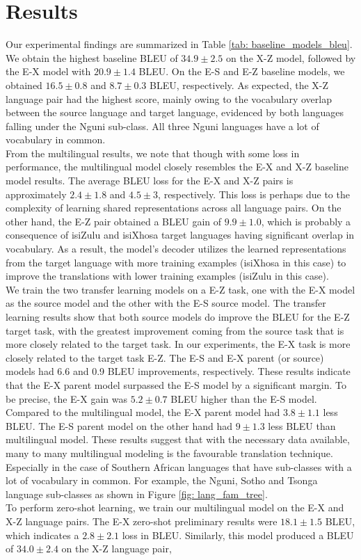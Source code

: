 \documentclass[11pt,a4paper]{article}
\begin{document}
\section{Results}\label{sec: results}
Our experimental findings are summarized in Table \ref{tab: baseline_models_bleu}. We obtain the highest baseline BLEU of $34.9 \pm2.5$ on the X-Z model, followed by the E-X model with $20.9 \pm1.4$ BLEU. On the E-S and E-Z baseline models, we obtained $16.5 \pm0.8$ and $8.7 \pm0.3$ BLEU, respectively. As expected, the X-Z language pair had the highest score, mainly owing to the vocabulary overlap between the source language and target language, evidenced by both languages falling under the Nguni sub-class. All three Nguni languages have a lot of vocabulary in common.\\ \indent From the multilingual results, we note that though with some loss in performance, the multilingual model closely resembles the E-X and X-Z baseline model results. The average BLEU loss for the  E-X and X-Z pairs is approximately $2.4 \pm 1.8$ and $4.5 \pm 3$, respectively. This loss is perhaps due to the complexity of learning shared representations across all language pairs. On the other hand, the E-Z pair obtained a BLEU gain of $9.9 \pm1.0$, which is probably a consequence of isiZulu and isiXhosa target languages having significant overlap in vocabulary. As a result, the model's decoder utilizes the learned representations from the target language with more training examples (isiXhosa in this case) to improve the translations with lower training examples (isiZulu in this case).\\ \indent We train the two transfer learning models on a E-Z task, one with the E-X model as the source model and the other with the E-S source model. The transfer learning results show that both source models do improve the BLEU for the E-Z target task, with the greatest improvement coming from the source task that is more closely related to the target task. In our experiments, the E-X task is more closely related to the target task E-Z. The E-S and E-X parent (or source) models had 6.6 and 0.9 BLEU improvements, respectively. These results indicate that the E-X parent model surpassed the E-S model by a significant margin. To be precise, the E-X gain was $5.2 \pm 0.7$ BLEU higher than the E-S model.\\ \indent Compared to the multilingual model, the E-X parent model had $3.8 \pm 1.1$ less BLEU. The E-S parent model on the other hand had $9 \pm 1.3$ less BLEU than multilingual model. These results suggest that with the necessary data available, many to many multilingual modeling is the favourable translation technique. Especially in the case of Southern African languages that have sub-classes with a lot of vocabulary in common. For example, the Nguni, Sotho and Tsonga language sub-classes as shown in Figure \ref{fig: lang_fam_tree}.\\  \indent To perform zero-shot learning, we train our multilingual model on the E-X and X-Z language pairs. The E-X zero-shot preliminary results were $18.1 \pm 1.5$ BLEU, which indicates a $2.8 \pm 2.1$ loss in BLEU. Similarly, this model produced a BLEU of $34.0 \pm 2.4$ on the X-Z language pair, 
\end{document}
